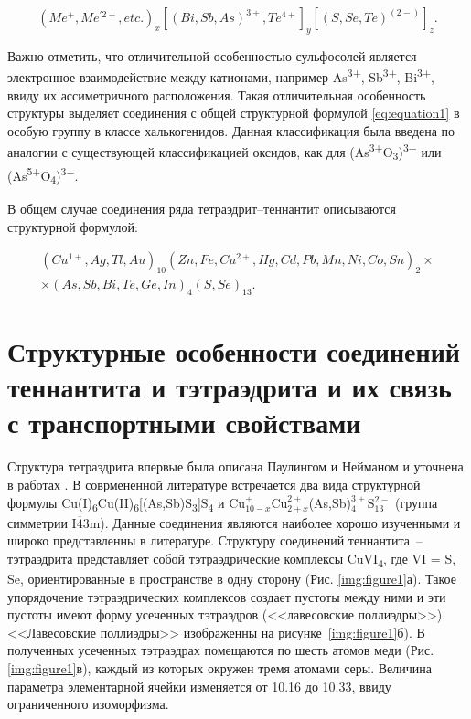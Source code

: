 \begin{equation}
  \label{eq:equation1}
  (Me^+,Me^{'2+},etc.)_{x}[(Bi, Sb,As)^{3+}, Te^{4+}]_{y}[(S,Se,Te)^{(2-)}]_{z}.
\end{equation}

Важно отметить, что отличительной особенностью сульфосолей является электронное взаимодействие между катионами, например As\textsuperscript{3+}, Sb\textsuperscript{3+}, Bi\textsuperscript{3+}, ввиду их ассиметричного расположения. Такая отличительная особенность структуры выделяет соединения с общей структурной формулой  \eqref{eq:equation1} в особую группу в классе халькогенидов. Данная классификация была введена по аналогии с существующей классификацией оксидов, как для (As\textsuperscript{3+}O\textsubscript{3})\textsuperscript{3$-$} или (As\textsuperscript{5+}O\textsubscript{4})\textsuperscript{3$-$}\cite{Nowacki1969}.

В общем случае соединения ряда тетраэдрит--теннантит описываются структурной формулой: 

\begin{equation}
  \label{eq:equation2}
      \begin{multlined}
      (Cu^{1+},Ag,Tl,Au)_{10}(Zn,Fe,Cu^{2+},Hg,Cd,Pb,Mn,Ni,Co,Sn)_{2}\times \\
      \times(As,Sb,Bi,Te,Ge,In)_{4}(S,Se)_{13}. 
      \end{multlined}
\end{equation}
\newpage


\section{Структурные особенности соединений теннантита и тэтраэдрита и их связь с транспортными свойствами} \label{sect1_1}

 Структура тетраэдрита впервые была описана Паулингом и Нейманом  \cite{Pauling1934} и уточнена в работах \cite{Wuensch1963,Wuensch1964,Belov1969,Kaplunnik1980}.
 В соврмененной литературе встречается два вида структурной формулы Cu(I)\textsubscript{6}Cu(II)\textsubscript{6}[(As,Sb)S\textsubscript{3}]S\textsubscript{4}\cite{Johnson1986} и Cu$_{10-x}^{+}$Cu$_{2+x}^{2+}$(As,Sb)$_{4}^{3+}$S$_{13}^{2-}$ \cite{Friese2008,makovicky2005crystal,Foit2001} (группа симметрии I$\overline{\! 4}$3m).
Данные соединения являются наиболее хорошо изученными и широко представленны в литературе. Структуру соединений теннантита~--тэтраэдрита представляет собой тэтраэдрические комплексы  CuVI\textsubscript{4}, где VI = S, Se, ориентированные в пространстве в одну сторону (Рис. \ref{img:figure1}а). Такое упорядочение тэтраэдрических комплексов создает пустоты между ними и эти пустоты имеют форму усеченных тэтраэдров (<<лавесовские поллиэдры>>). <<Лавесовские поллиэдры>> изображенны на рисунке~\ref{img:figure1}б). В полученных усеченных тэтраэдрах помещаются по шесть атомов меди (Рис. \ref{img:figure1}в), каждый из которых окружен тремя атомами серы\cite{Makovicky_2006}. Величина параметра элементарной ячейки изменяется от 10.16 до 10.33, ввиду ограниченного изоморфизма.

